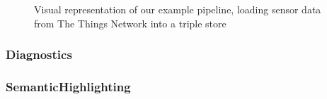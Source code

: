 \begin{figure}[!ht]
 \centering
  \caption{Visual representation of our example pipeline, 
      loading sensor data from The Things Network into a triple store}\label{fig:Completion}
\end{figure}

\subsubsection*{Diagnostics}




\subsubsection*{SemanticHighlighting}

